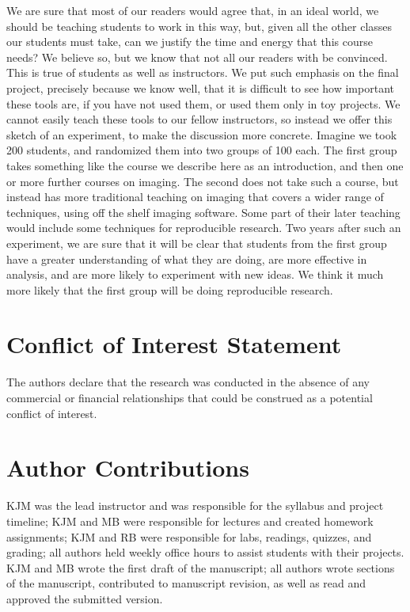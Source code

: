 We are sure that most of our readers would agree that, in an ideal world, we
should be teaching students to work in this way, but, given all the other
classes our students must take, can we justify the time and energy that this
course needs?  We believe so, but we know that not all our readers with be
convinced.  This is true of students as well as
instructors.  We put such emphasis on the final project, precisely because we
know well, that it is difficult to see how important these tools are, if you
have not used them, or used them only in toy projects.  We cannot easily teach
these tools to our fellow instructors, so instead we offer this sketch of an
experiment, to make the discussion more concrete.  Imagine we took 200
students, and randomized them into two groups of 100 each.  The first group
takes something like the course we describe here as an introduction, and then
one or more further courses on imaging.  The second does not take such a
course, but instead has more traditional teaching on imaging that covers a
wider range of techniques, using off the shelf imaging software.  Some part of
their later teaching would include some techniques for reproducible research.
Two years after such an experiment, we are sure that it will be clear that
students from the first group have a greater understanding of what they are
doing, are more effective in analysis, and are more likely to experiment with
new ideas.  We think it much more likely that the first group will be doing
reproducible research.

\section*{Conflict of Interest Statement}

The authors declare that the research was conducted in the absence of any
commercial or financial relationships that could be construed as a potential
conflict of interest.

\section*{Author Contributions}

KJM was the lead instructor and was responsible for the syllabus and project timeline;
KJM and MB were responsible for lectures and created homework assignments;
KJM and RB were responsible for labs, readings, quizzes, and grading;
all authors held weekly office hours to assist students with their projects.
KJM and MB wrote the first draft of the manuscript;
all authors wrote sections of the manuscript, contributed to manuscript revision, 
as well as read and approved the submitted version.
